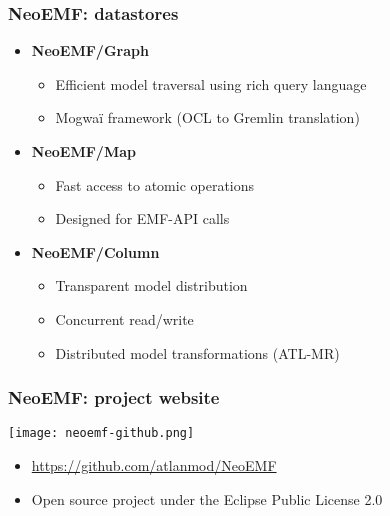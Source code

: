 \begin{frame}[c]\frametitle{NeoEMF: datastores~\cite{DBLP:conf/models/DanielSBTVGC16}}
	\begin{itemize}
	\item \textbf{NeoEMF/Graph}
		\begin{itemize}
		\item Efficient model traversal using rich query language
		\item Mogwaï framework (OCL to Gremlin translation)
		\end{itemize}
	\item \textbf{NeoEMF/Map}
		\begin{itemize}
		\item Fast access to atomic operations
		\item Designed for EMF-API calls
		\end{itemize}
	\item \textbf{NeoEMF/Column}
		\begin{itemize}
		\item Transparent model distribution
		\item Concurrent read/write
		\item Distributed model transformations (ATL-MR)
		\end{itemize}
	\end{itemize}
\end{frame}

\begin{frame}[t]\frametitle{NeoEMF: project website}
  \begin{center}
    \texttt{[image: neoemf-github.png]}
  \end{center}
	
  \begin{itemize}
  \item \url{https://github.com/atlanmod/NeoEMF}
  \item Open source project under the Eclipse Public License 2.0
  \end{itemize}
\end{frame}

